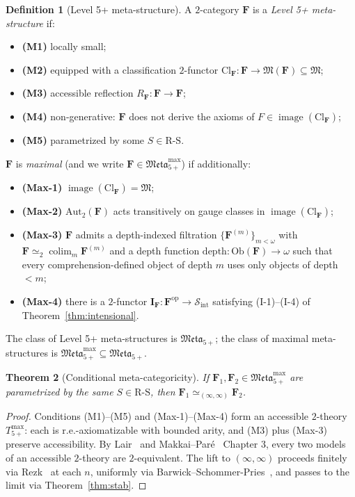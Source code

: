 \documentclass[11pt]{article}
\theoremstyle{plain}
\newtheorem{theorem}{Theorem}[section]
\theoremstyle{definition}
\newtheorem{definition}[theorem]{Definition}
\newcommand{\RS}{\mathrm{R\text{-}S}}
\newcommand{\cS}{\mathcal{S}}
\newcommand{\fM}{\mathfrak{M}}
\newcommand{\Meta}{\mathfrak{Meta}}
\newcommand{\Sint}{\cS_{\mathrm{int}}}
\newcommand{\Ob}{\mathrm{Ob}}
\newcommand{\Cl}{\mathrm{Cl}}
\newcommand{\II}{\mathbf{I}}
\DeclareMathOperator{\colim}{colim}
\DeclareMathOperator{\image}{image}
\begin{document}
\begin{definition}[Level 5+ meta-structure]\label{def:meta}
A $2$-category $\mathbf{F}$ is a \emph{Level 5+ meta-structure} if:
\begin{itemize}
\item \textbf{(M1)} locally small;
\item \textbf{(M2)} equipped with a classification $2$-functor $\Cl_{\mathbf{F}} : \mathbf{F} \to \fM(\mathbf{F}) \subseteq \fM$;
\item \textbf{(M3)} accessible reflection $R_{\mathbf{F}} : \mathbf{F} \to \mathbf{F}$;
\item \textbf{(M4)} non-generative: $\mathbf{F}$ does not derive the axioms of $F \in \image(\Cl_{\mathbf{F}})$;
\item \textbf{(M5)} parametrized by some $S \in \RS$.
\end{itemize}
$\mathbf{F}$ is \emph{maximal} (and we write $\mathbf{F} \in \Meta_{5+}^{\max}$) if additionally:
\begin{itemize}
\item \textbf{(Max-1)} $\image(\Cl_{\mathbf{F}}) = \fM$;
\item \textbf{(Max-2)} $\mathrm{Aut}_2(\mathbf{F})$ acts transitively on gauge classes in $\image(\Cl_{\mathbf{F}})$;
\item \textbf{(Max-3)} $\mathbf{F}$ admits a depth-indexed filtration $\{\mathbf{F}^{(m)}\}_{m < \omega}$ with $\mathbf{F} \simeq_2 \colim_m \mathbf{F}^{(m)}$ and a depth function $\mathrm{depth} : \Ob(\mathbf{F}) \to \omega$ such that every comprehension-defined object of depth $m$ uses only objects of depth $< m$;
\item \textbf{(Max-4)} there is a $2$-functor $\II_{\mathbf{F}} : \mathbf{F}^{\mathrm{op}} \to \Sint$ satisfying (I-1)--(I-4) of Theorem~\ref{thm:intensional}.
\end{itemize}
The class of Level 5+ meta-structures is $\Meta_{5+}$; the class of maximal meta-structures is $\Meta_{5+}^{\max} \subseteq \Meta_{5+}$.
\end{definition}

\begin{theorem}[Conditional meta-categoricity]\label{thm:meta-cat}
If $\mathbf{F}_1, \mathbf{F}_2 \in \Meta_{5+}^{\max}$ are parametrized by the same $S \in \RS$, then $\mathbf{F}_1 \simeq_{(\infty, \infty)} \mathbf{F}_2$.
\end{theorem}

\begin{proof}
Conditions (M1)--(M5) and (Max-1)--(Max-4) form an accessible $2$-theory $T_{5+}^{\max}$: each is r.e.-axiomatizable with bounded arity, and (M3) plus (Max-3) preserve accessibility. By Lair~\cite{Lair1981} and Makkai--Par\'e~\cite{MakkaiPare1989} Chapter 3, every two models of an accessible $2$-theory are $2$-equivalent. The lift to $(\infty, \infty)$ proceeds finitely via Rezk~\cite{Rezk2010} at each $n$, uniformly via Barwick--Schommer-Pries~\cite{BarwickSchommerPries2021}, and passes to the limit via Theorem~\ref{thm:stab}.
\end{proof}
\end{document}
